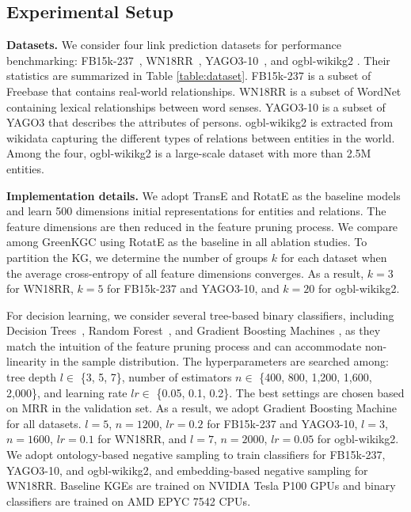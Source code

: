 \documentclass{article}
\begin{document}
\subsection{Experimental Setup}

{\bf Datasets.} We consider four link prediction datasets for 
performance benchmarking: FB15k-237~\citep{bordes2013translating,
toutanova2015observed}, WN18RR~\citep{bordes2013translating,
dettmers2018convolutional}, YAGO3-10~\citep{dettmers2018convolutional},
and ogbl-wikikg2 \citep{hu2020open}.
Their statistics are summarized in Table \ref{table:dataset}. 
FB15k-237 is a subset of Freebase
\citep{bollacker2008freebase} that contains real-world relationships.
WN18RR is a subset of WordNet \citep{miller1995wordnet} containing
lexical relationships between word senses. YAGO3-10 is a subset of YAGO3
\citep{mahdisoltani2014yago3} that describes the attributes of persons.
ogbl-wikikg2 is extracted from wikidata \citep{vrandevcic2014wikidata}
capturing the different types of relations between entities in the world.
Among the four, ogbl-wikikg2 is a large-scale dataset with more than 2.5M
entities.

{\bf Implementation details.} We adopt TransE \citep{bordes2013translating} 
and RotatE \citep{sun2018rotate} as the baseline models and learn 500 
dimensions initial representations for entities and relations. The feature
dimensions are then reduced in the feature pruning process.
We compare among GreenKGC using RotatE as the baseline in all ablation studies.
To partition the KG, we determine the number of groups $k$ for each dataset
when the average cross-entropy of all feature dimensions converges. As a result,
$k=3$ for WN18RR, $k=5$ for FB15k-237 and YAGO3-10, and $k=20$ for ogbl-wikikg2.

For decision learning, we consider several tree-based binary classifiers, 
including Decision Trees~\citep{breiman2017classification}, 
Random Forest~\citep{breiman2001random}, and Gradient Boosting Machines 
\citep{chen2016xgboost}, as they match the intuition of the feature 
pruning process and can accommodate non-linearity in the sample
distribution. The hyperparameters are searched among: 
tree depth $l \in$ \{3, 5, 7\}, number of estimators $n \in$ \{400, 800,
1,200, 1,600, 2,000\}, and learning rate $lr \in$ \{0.05, 0.1, 
0.2\}. The best settings are chosen based on MRR in the validation set. As 
a result, we adopt Gradient Boosting Machine for all datasets. 
$l = 5$, $n = 1200$, $lr = 0.2$ for FB15k-237 and YAGO3-10, 
$l = 3$, $n = 1600$, $lr = 0.1$ for WN18RR, and $l = 7$, $n = 2000$, 
$lr = 0.05$ for ogbl-wikikg2. We adopt ontology-based
negative sampling to train classifiers for FB15k-237, YAGO3-10, 
and ogbl-wikikg2, and embedding-based negative sampling for WN18RR. 
Baseline KGEs are trained on NVIDIA Tesla P100 GPUs and binary 
classifiers are trained on AMD EPYC 7542 CPUs.
\end{document}
